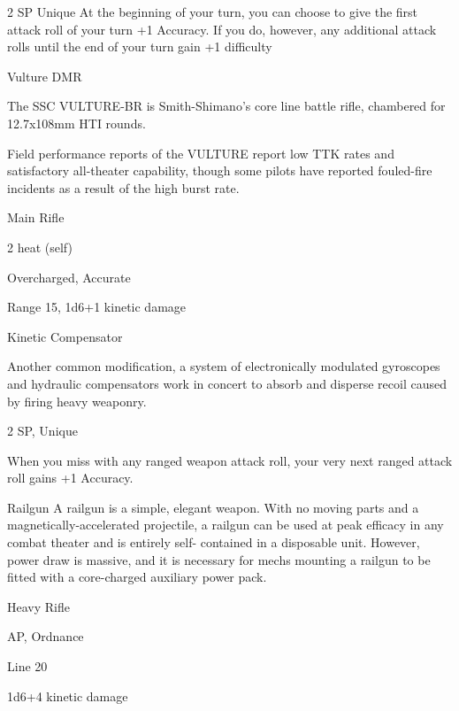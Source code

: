 2 SP
Unique
At the beginning of your turn, you can choose to give the first attack roll of your turn +1
Accuracy. If you do, however, any additional attack rolls until the end of your turn gain +1
difficulty


Vulture DMR

The SSC VULTURE-BR is Smith-Shimano’s core line battle rifle, chambered for 12.7x108mm HTI rounds.

Field performance reports of the VULTURE report low TTK rates and satisfactory all-theater capability,
though some pilots have reported fouled-fire incidents as a result of the high burst rate.

Main Rifle

2 heat (self)

Overcharged, Accurate

Range 15, 1d6+1 kinetic damage


Kinetic Compensator

Another common modification, a system of electronically modulated gyroscopes and hydraulic
compensators work in concert to absorb and disperse recoil caused by firing heavy weaponry.

2 SP, Unique

When you miss with any ranged weapon attack roll, your very next ranged attack roll gains +1
Accuracy.


Railgun
A railgun is a simple, elegant weapon. With no moving parts and a magnetically-accelerated
projectile, a railgun can be used at peak efficacy in any combat theater and is entirely self-
contained in a disposable unit. However, power draw is massive, and it is necessary for mechs
mounting a railgun to be fitted with a core-charged auxiliary power pack.

Heavy Rifle

AP, Ordnance

Line 20

1d6+4 kinetic damage
